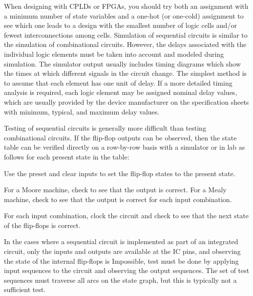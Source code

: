 \documentclass[a4paper,12pt]{report}
\begin{document}
When designing with CPLDs or FPGAs, you should try both an assignment with a minimum number of state variables and a one-hot (or one-cold) assignment to see which one leads to a design with the smallest number of logic cells and/or fewest interconnections among cells.
Simulation of sequential circuits is similar to the simulation of combinational circuits. However, the delays associated with the individual logic elements must be taken into account and modeled during simulation. The simulator output usually includes timing diagrams which show the times at which different signals in the circuit change. The simplest method is to assume that each element has one unit of delay. If a more detailed timing analysis is required, each logic element may be assigned nominal delay values, which are usually provided by the device manufacturer on the specification sheets with minimum, typical, and maximum delay values.

Testing of sequential circuits is generally more difficult than testing combinational circuits. If the flip-flop outputs can be observed, then the state table can be verified directly on a row-by-row basis with a simulator or in lab as follows for each present state in the table:
\ben
\item Use the preset and clear inputs to set the flip-flop states to the present state.
\item For a Moore machine, check to see that the output is correct. For a Mealy machine, check to see that the output is correct for each input combination.
\item For each input combination, clock the circuit and check to see that the next state of the flip-flops is correct.
\een

In the cases where a sequential circuit is implemented as part of an integrated circuit, only the inputs and outputs are available at the IC pins, and observing the state of the internal flip-flops is Impossible, test must be done by applying input sequences to the circuit and observing the output sequences. The set of test sequences must traverse all arcs on the state graph, but this is typically not a sufficient test.
\end{document}
